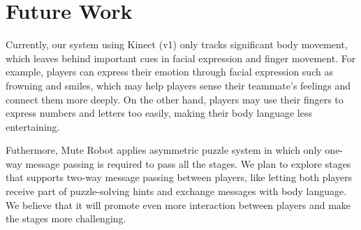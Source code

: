 \documentclass{chi-ext}
\begin{document}





\section{Future Work}

Currently, our system using Kinect (v1) only tracks significant body movement, which leaves behind important cues in facial expression and finger movement. 
For example, players can express their emotion through facial expression such as frowning and smiles, which may help players sense their teammate's feelings and connect them more deeply. On the other hand, players may use their fingers to express numbers and letters too easily, making their body language less entertaining. 


Futhermore, Mute Robot applies asymmetric puzzle system in which
only one-way message passing is required to pass all the stages.
We plan to explore stages that supports two-way message passing between players, like letting both players receive part of puzzle-solving hints and exchange messages with body language.
We believe that it will promote even more interaction between players and make the stages more challenging.
\end{document}
